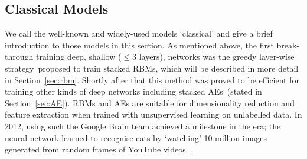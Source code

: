 \subsection{Classical Models}
We call the well-known and widely-used \DIFdelbegin {}\DIFdelend \DIFaddbegin {}\DIFaddend models `classical' and give a brief introduction to those models in this section. 
As mentioned above, the first break-through \DIFdelbegin {}\DIFdelend \DIFaddbegin {}\DIFaddend training deep, \DIFdelbegin {}\DIFdelend \DIFaddbegin {}\DIFaddend shallow ($\le 3$ layers), networks was the greedy layer-wise strategy~\DIFdelbegin {}\DIFdelend \DIFaddbegin {}\DIFaddend proposed to train stacked RBMs, which will be described in more detail in Section~\ref{sec:rbm}.
Shortly after that this method was proved to be efficient for training other kinds of deep networks including stacked AEs~\DIFdelbegin {}\DIFdelend \DIFaddbegin {}\DIFaddend (stated in Section~\ref{sec:AE}).
RBMs and AEs are suitable for dimensionality reduction and feature extraction when trained with unsupervised learning on unlabelled data.
In 2012, using such \DIFdelbegin {}\DIFdelend \DIFaddbegin {}\DIFaddend the Google Brain team achieved a milestone in the \DIFdelbegin {}\DIFdelend \DIFaddbegin {}\DIFaddend era; the neural network learned to recognise cats by `watching' 10 million images generated from random frames of YouTube videos~\DIFdelbegin {}\DIFdelend \DIFaddbegin {}\DIFaddend .

